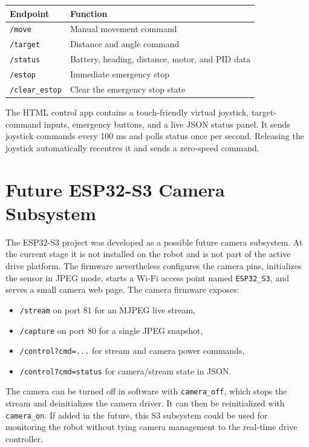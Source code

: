 \documentclass[11pt,a4paper]{article}
\begin{document}
\begin{center}
\begin{tabular}{@{}ll@{}}
\toprule
Endpoint & Function \\
\midrule
\texttt{/move} & Manual movement command \\
\texttt{/target} & Distance and angle command \\
\texttt{/status} & Battery, heading, distance, motor, and PID data \\
\texttt{/estop} & Immediate emergency stop \\
\texttt{/clear\_estop} & Clear the emergency stop state \\
\bottomrule
\end{tabular}
\end{center}

The HTML control app contains a touch-friendly virtual joystick, target-command
inputs, emergency buttons, and a live JSON status panel. It sends joystick
commands every 100 ms and polls status once per second. Releasing the joystick
automatically recentres it and sends a zero-speed command.

\section{Future ESP32-S3 Camera Subsystem}

The ESP32-S3 project was developed as a possible future camera subsystem. At
the current stage it is not installed on the robot and is not part of the
active drive platform. The firmware nevertheless configures the camera pins,
initializes the sensor in JPEG mode, starts a Wi-Fi access point named
\texttt{ESP32\_S3}, and serves a small camera web page. The camera firmware
exposes:

\begin{itemize}
  \item \texttt{/stream} on port 81 for an MJPEG live stream,
  \item \texttt{/capture} on port 80 for a single JPEG snapshot,
  \item \texttt{/control?cmd=...} for stream and camera power commands,
  \item \texttt{/control?cmd=status} for camera/stream state in JSON.
\end{itemize}

The camera can be turned off in software with \texttt{camera\_off}, which stops
the stream and deinitializes the camera driver. It can then be reinitialized
with \texttt{camera\_on}. If added in the future, this S3 subsystem could be
used for monitoring the robot without tying camera management to the real-time
drive controller.
\end{document}
